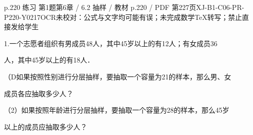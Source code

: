 \begin{bankitem}{p.220 练习 第1题}{第6章 / 6.2 抽样 / 教材 p.220 / PDF 第227页}{XJ-B1-C06-PR-P220-Y0217}{OCR未校对：公式与文字均可能有误；未完成数学TeX转写；禁止直接发给学生}
\begin{ocrdraft}
\par
1.一个志愿者组织有男成员48人，其中45岁以上的有12人；有女成员36
\par
人，其中45岁以上的有18人．
\par
（D如果按照性别进行分层抽样，要抽取一个容量为21的样本，那么男、女
\par
成员各应抽取多少人？
\par
（2）如果按照年龄进行分层抽样，要抽取一个容量为28的样本，那么45岁
\par
以上的成员应抽取多少人？
\end{ocrdraft}
\end{bankitem}
